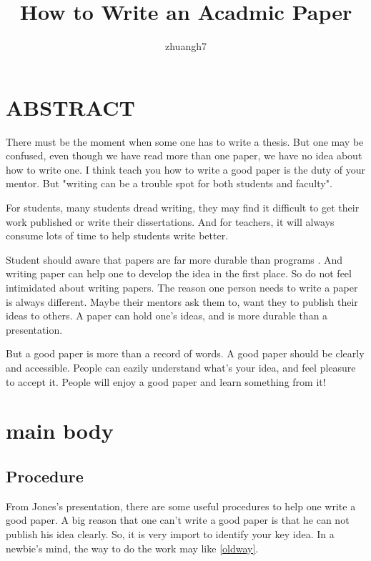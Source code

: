 \documentclass{article}
\author{zhuangh7}
\title{How to Write an Acadmic Paper}
\begin{document}
\maketitle
\section{ABSTRACT}
There must be the moment when some one has to write a thesis.
But one may be confused, even though we have read more than one paper, 
we have no idea about how to write one.
I think teach you how to write a good paper is the duty of your mentor.
But "writing can be a trouble spot for both students and faculty"\cite{LearnIn2Hours}.

For students, many students dread writing, they may find it difficult to get their work published 
or write their dissertations.
And for teachers, it will always consume lots of time to help students write better.

Student should aware that papers are far more durable than programs \cite{AGreatResearchPaper}.
And writing paper can help one to develop the idea in the first place.
So do not feel intimidated about writing papers.
The reason one person needs to write a paper is always different.
Maybe their mentors ask them to, want they to publish their ideas to others.
A paper can hold one's ideas, and is more durable than a presentation.

But a good paper is more than a record of words.
A good paper should be clearly and accessible.
People can eazily understand what's your idea, 
and feel pleasure to accept it.
People will enjoy a good paper and learn something from it! \cite{d}


\section{main body}
\subsection{Procedure}
From Jones's\cite{AGreatResearchPaper} presentation, 
there are some useful procedures to help one write a good paper.
A big reason that one can't write a good paper is that he can not publish his idea clearly.
So, it is very import to identify your key idea.
In a newbie's mind, the way to do the work may like \ref{oldway}.
\end{document}
